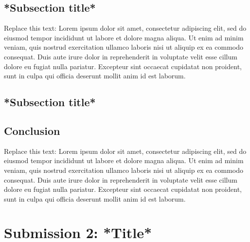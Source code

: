 \documentclass[a4paper, 10pt]{article}
\begin{document}
\begin{multicols*}{2}
\subsection{*Subsection title*}

Replace this text: Lorem ipsum dolor sit amet, consectetur adipiscing elit, sed do eiusmod tempor incididunt ut labore et dolore magna aliqua. Ut enim ad minim veniam, quis nostrud exercitation ullamco laboris nisi ut aliquip ex ea commodo consequat. Duis aute irure dolor in reprehenderit in voluptate velit esse cillum dolore eu fugiat nulla pariatur. Excepteur sint occaecat cupidatat non proident, sunt in culpa qui officia deserunt mollit anim id est laborum.


\vspace{0.3cm}
\subsection{*Subsection title*}




\vspace{0.3cm}
\subsection{Conclusion}

Replace this text: Lorem ipsum dolor sit amet, consectetur adipiscing elit, sed do eiusmod tempor incididunt ut labore et dolore magna aliqua. Ut enim ad minim veniam, quis nostrud exercitation ullamco laboris nisi ut aliquip ex ea commodo consequat. Duis aute irure dolor in reprehenderit in voluptate velit esse cillum dolore eu fugiat nulla pariatur. Excepteur sint occaecat cupidatat non proident, sunt in culpa qui officia deserunt mollit anim id est laborum.



\end{multicols*}



\newpage
\section{Submission 2: *Title*}
\end{document}
